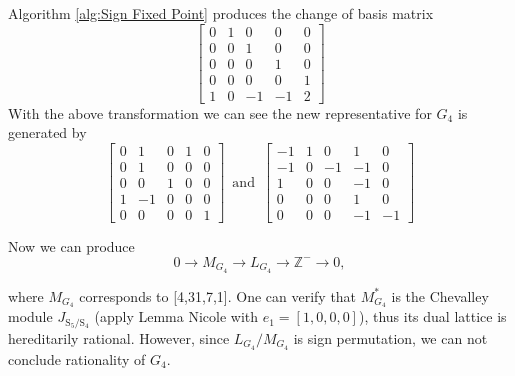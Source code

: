 \documentclass{article}
\theoremstyle{plain}
\theoremstyle{definition}
\newcommand{\Z}{\ensuremath{\mathbb{Z}}}
\newcommand{\tand}{\ensuremath{\,\,\, \text{and} \,\,\,}}
\newcommand{\exactseqs}[1]{\ensuremath{0 \longrightarrow M_{#1} \longrightarrow L_{#1} \longrightarrow \Z^{-} \longrightarrow 0}}
\begin{document}
Algorithm \ref{alg:Sign Fixed Point} produces the change of basis matrix 
$$
 \left[ \begin {array}{ccccc} 0&1&0&0&0\\ 0&0&1&0&0
\\ 0&0&0&1&0\\ 0&0&0&0&1
\\ 1&0&-1&-1&2\end {array} \right] 
$$
With the above transformation we can see the new representative for $G_4$ is generated by 
$$
\left[ \begin {array}{cccc|c} 0&1&0&1&0\\0&1&0&0&0
\\0&0&1&0&0\\1&-1&0&0&0
\\\hline 0&0&0&0&1\end {array} \right] 
\tand
 \left[ \begin {array}{cccc|c} -1&1&0&1&0\\-1&0&-1&-
1&0\\1&0&0&-1&0\\0&0&0&1&0
\\ \hline0&0&0&-1&-1\end {array} \right] 
$$

Now we can produce
$$
\exactseqs{G_4}
,$$

where $M_{G_4}$ corresponds to [4,31,7,1]. One can verify that $M_{G_4}^*$ is the Chevalley module $J_{\mathrm{S}_5/\mathrm{S}_4}$ (apply Lemma Nicole with $e_1 =[1,0,0,0]$), thus its dual lattice is hereditarily rational. However, since $L_{G_4}/M_{G_4}$ is sign permutation, we can not conclude rationality of $G_4$.
\end{document}
